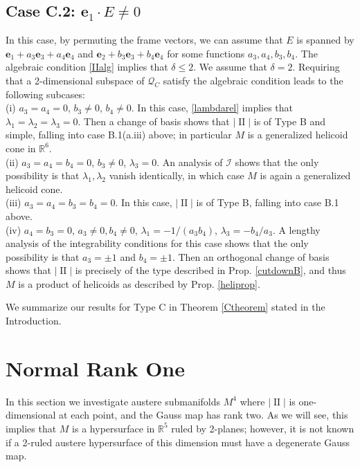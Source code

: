 \documentclass[12pt,reqno]{amsart}
\theoremstyle{definition}
\theoremstyle{remark}
\begin{document}
\subsection*{Case C.2: ${\mathbf e}_1\cdot E\not=0$} In this case, by permuting the frame vectors,
we can assume that $E$ is spanned by ${\mathbf e}_1+a_3{\mathbf e}_3+a_4{\mathbf e}_4$ and ${\mathbf e}_2+b_3{\mathbf e}_3+b_4{\mathbf e}_4$
for some functions $a_3,a_4, b_3, b_4$. The algebraic condition  \eqref{IIalg} implies that $\delta\leq 2$.
We assume that $\delta =2$.  Requiring that
a 2-dimensional subspace of ${\mathcal Q}_C$ satisfy the algebraic condition leads to the following subcases:\\
(i) $a_3=a_4=0$, $b_3\ne 0$, $b_4\ne 0$.  In this case, \eqref{lambdarel} implies that $\lambda_1=\lambda_2=\lambda_3=0$.
Then a change of basis shows that $|{\operatorname{II}}|$ is of Type B  and simple, falling into
case  B.1(a.iii) above; in particular $M$ is a generalized helicoid cone in ${\mathbb R}^6$.\\
(ii) $a_3=a_4= b_4= 0$, $b_3\not = 0$, $\lambda_3=0$.  An analysis of ${{\mathcal I}}$ shows that
the only possibility is that $\lambda_1,\lambda_2$ vanish identically, in which case $M$ is again
a generalized helicoid cone.\\
(iii) $a_3=a_4= b_3=b_4 = 0$.  In this case, $|{\operatorname{II}}|$ is of Type B, falling into case B.1 above.\\
(iv) $a_4=b_3=0$, $a_3\not =0, b_4\not = 0$, $\lambda_1=-1/(a_3b_4)$, $\lambda_3=-b_4/a_3$.
A lengthy analysis of the integrability conditions for this case shows that the only possibility is that
$a_3=\pm1$ and $b_4=\pm1$.  Then an orthogonal change of basis shows that $|{\operatorname{II}}|$ is precisely of
the type described in Prop. \ref{cutdownB}, and thus $M$ is a product of helicoids as described by Prop. \ref{heliprop}.

\bigskip
We summarize our results for Type C in Theorem \ref{Ctheorem} stated in the Introduction.

\section{Normal Rank One}
In this section we investigate austere submanifolds $M^4$ where $|{\operatorname{II}} |$ is one-dimensional at each point,
and the Gauss map has rank two.  As we will see, this implies that $M$ is a hypersurface in ${\mathbb R}^5$ ruled by 2-planes; however, it is not known if a 2-ruled austere hypersurface of this dimension must have a degenerate Gauss map.
\end{document}
